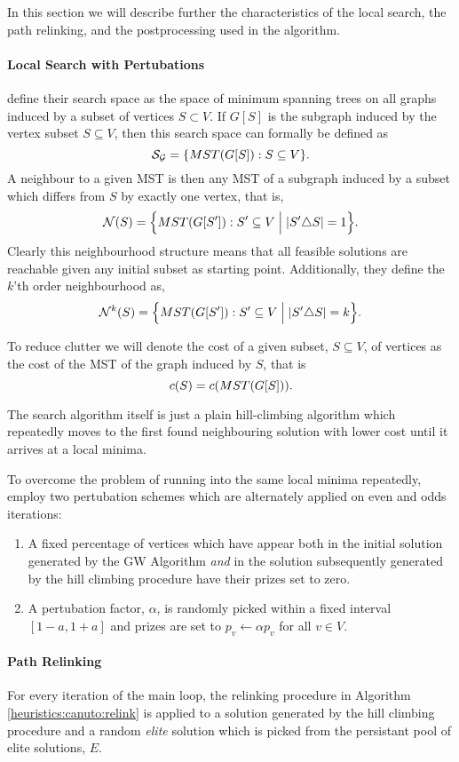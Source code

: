  In this section we will
 describe further the characteristics of the local search, the
 path relinking, and the postprocessing used in the algorithm.
\paragraph{Local Search with Pertubations}
\citet{canuto2001local} define their search space as the space of minimum spanning
trees on all graphs induced by a subset of vertices
 $S \subset V$. If $G[S]$ is the subgraph induced by the vertex subset $S \subseteq V$, then
 this search space can formally be defined as
$$\mathcal{S_G} = \{MST(G[S]) : S \subseteq V \}\mathnormal{.}$$
A neighbour to a given MST is then any MST of a subgraph induced by a subset which differs from $S$
 by exactly one vertex, that is,
$$\mathcal{N}(S) = \Big\{MST(G[S']) : S' \subseteq V \Bigm| |S' \triangle S| = 1 \Big\}\mathnormal{.}$$ 
Clearly this neighbourhood structure means that all feasible solutions are reachable
given any initial subset as starting point. Additionally, they define the
$k$'th order neighbourhood as,
$$\mathcal{N}^k(S) = \Big\{MST(G[S']) : S' \subseteq V \Bigm| |S' \triangle S| = k \Big\}\mathnormal{.}$$ 

To reduce clutter we will denote the cost
of a given subset, $S \subseteq V$, of vertices as the cost
of the MST of the graph induced by $S$, that is
$$c(S) = c(MST(G[S]))\mathnormal{.}$$

The search algorithm itself is just a plain hill-climbing algorithm which repeatedly
 moves to the first
 found neighbouring solution with lower cost until it arrives at a local minima.

 To overcome the problem of running into the same local minima repeatedly,
 \citet{canuto2001local} employ two pertubation schemes which are alternately applied
 on even and odds iterations:
 \begin{enumerate}
 \item A fixed percentage of vertices which have appear both in the initial solution generated
   by the GW Algorithm \textit{and}  in the solution subsequently generated by
    the hill climbing procedure have their prizes
    set to zero.
  \item A pertubation factor, $\alpha$, is randomly picked within a fixed interval $[1 -a, 1+a]$
    and prizes are set to $p_v \gets \alpha p_v$ for all $v \in V$.
 \end{enumerate}

\paragraph{Path Relinking}
For every iteration of the main loop, the relinking procedure in Algorithm \ref{heuristics:canuto:relink}
is applied to a solution generated by the hill climbing procedure and 
a random \textit{elite} solution which is picked from the
persistant pool of elite solutions, $E$.

